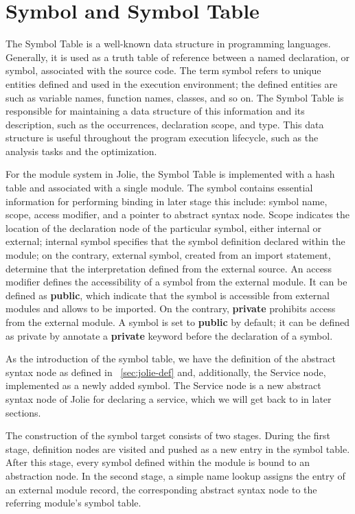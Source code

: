 
\section{Symbol and Symbol Table}

The Symbol Table is a well-known data structure in programming languages. Generally, it is used as a truth table of reference between a named declaration, or symbol, associated with the source code. The term symbol refers to unique entities defined and used in the execution environment; the defined entities are such as variable names, function names, classes, and so on.
The Symbol Table is responsible for maintaining a data structure of this information and its description, such as the occurrences, declaration scope, and type. This data structure is useful throughout the program execution lifecycle, such as the analysis tasks and the optimization.

For the module system in Jolie, the Symbol Table is implemented with a hash table and associated with a single module.
The symbol contains essential information for performing binding in later stage this include: symbol name, scope, access modifier, and a pointer to abstract syntax node.
Scope indicates the location of the declaration node of the particular symbol, either internal or external; internal symbol specifies that the symbol definition declared within the module; on the contrary, external symbol, created from an import statement, determine that the interpretation defined from the external source.
An access modifier defines the accessibility of a symbol from the external module. It can be defined as \textbf{public}, which indicate that the symbol is accessible from external modules and allows to be imported. On the contrary, \textbf{private} prohibits access from the external module. A symbol is set to \textbf{public} by default; it can be defined as private by annotate a \textbf{private} keyword before the declaration of a symbol.

As the introduction of the symbol table, we have the definition of the abstract syntax node as defined in ~\ref{sec:jolie-def} and, additionally, the Service node, implemented as a newly added symbol. The Service node is a new abstract syntax node of Jolie for declaring a service, which we will get back to in later sections.

The construction of the symbol target consists of two stages. During the first stage, definition nodes are visited and pushed as a new entry in the symbol table. After this stage, every symbol defined within the module is bound to an abstraction node. In the second stage, a simple name lookup assigns the entry of an external module record, the corresponding abstract syntax node to the referring module's symbol table.

